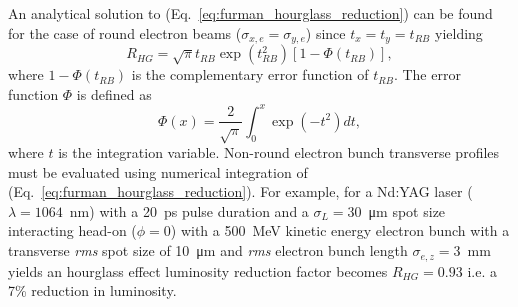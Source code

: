 \documentclass[../main.tex]{subfiles}
\begin{document}
An analytical solution to (Eq.~\ref{eq:furman_hourglass_reduction}) can be found for the case of round electron beams ($\sigma_{x,e}=\sigma_{y,e}$) since $t_{x}=t_{y}=t_{RB}$ yielding
\begin{equation}
R_{HG} = \sqrt{\pi}t_{RB}\exp\left(t_{RB}^{2}\right)\left[1-\Phi\left(t_{RB}\right)\right],
\label{eq:furman_hourglass_reduction_analytical}    
\end{equation}
where $1-\Phi\left(t_{RB}\right)$ is the complementary error function of $t_{RB}$. The error function $\Phi$ is defined as
\begin{equation}
\Phi\left(x\right) = \frac{2}{\sqrt{\pi}}\int_{0}^{x}\exp\left(-t^{2}\right)dt,
\label{eq:error_function}    
\end{equation}
where $t$ is the integration variable. Non-round electron bunch transverse profiles must be evaluated using numerical integration of (Eq.~\ref{eq:furman_hourglass_reduction}). For example, for a Nd:YAG laser ($\lambda = 1064$~\si{\nano\meter}) with a 20~\si{\pico\second} pulse duration and a $\sigma_{L} = 30$~\si{\micro\meter} spot size interacting head-on ($\phi=0$) with a 500~\si{\mega\electronvolt} kinetic energy electron bunch with a transverse \textit{rms} spot size of 10~\si{\micro\meter} and \textit{rms} electron bunch length $\sigma_{e,z} = 3$~\si{\milli\meter} yields an hourglass effect luminosity reduction factor becomes $R_{HG} = 0.93$ i.e. a 7\% reduction in luminosity.
\end{document}
